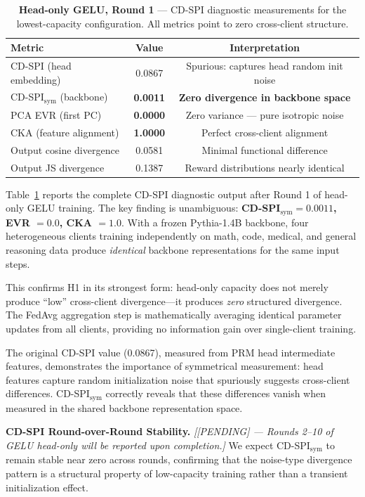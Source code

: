 \documentclass{article}
\begin{document}
\begin{table}[h]
\centering
\caption{\textbf{Head-only GELU, Round 1} --- CD-SPI diagnostic measurements for the lowest-capacity configuration. All metrics point to zero cross-client structure.}
\label{tab:gelu_r1}
\begin{tabular}{@{}lcc@{}}
\toprule
\textbf{Metric} & \textbf{Value} & \textbf{Interpretation} \\
\midrule
CD-SPI (head embedding)      & 0.0867 & Spurious: captures head random init noise \\
CD-SPI$_{\text{sym}}$ (backbone) & \textbf{0.0011} & \textbf{Zero divergence in backbone space} \\
PCA EVR (first PC)           & \textbf{0.0000} & Zero variance --- pure isotropic noise \\
CKA (feature alignment)      & \textbf{1.0000} & Perfect cross-client alignment \\
Output cosine divergence     & 0.0581 & Minimal functional difference \\
Output JS divergence         & 0.1387 & Reward distributions nearly identical \\
\bottomrule
\end{tabular}
\end{table}

Table~\ref{tab:gelu_r1} reports the complete CD-SPI diagnostic output after Round 1 of head-only GELU training.
The key finding is unambiguous: \textbf{CD-SPI$_{\text{sym}} = 0.0011$, EVR $= 0.0$, CKA $= 1.0$}.
With a frozen Pythia-1.4B backbone, four heterogeneous clients training independently on math, code, medical, and general reasoning data produce \emph{identical} backbone representations for the same input steps.

This confirms H1 in its strongest form: head-only capacity does not merely produce ``low'' cross-client divergence---it produces \emph{zero} structured divergence.
The FedAvg aggregation step is mathematically averaging identical parameter updates from all clients, providing no information gain over single-client training.

The original CD-SPI value (0.0867), measured from PRM head intermediate features, demonstrates the importance of symmetrical measurement: head features capture random initialization noise that spuriously suggests cross-client differences.
CD-SPI$_{\text{sym}}$ correctly reveals that these differences vanish when measured in the shared backbone representation space.

\textbf{CD-SPI Round-over-Round Stability.}
\emph{[[PENDING] --- Rounds 2--10 of GELU head-only will be reported upon completion.]}
We expect CD-SPI$_{\text{sym}}$ to remain stable near zero across rounds, confirming that the noise-type divergence pattern is a structural property of low-capacity training rather than a transient initialization effect.
\end{document}
